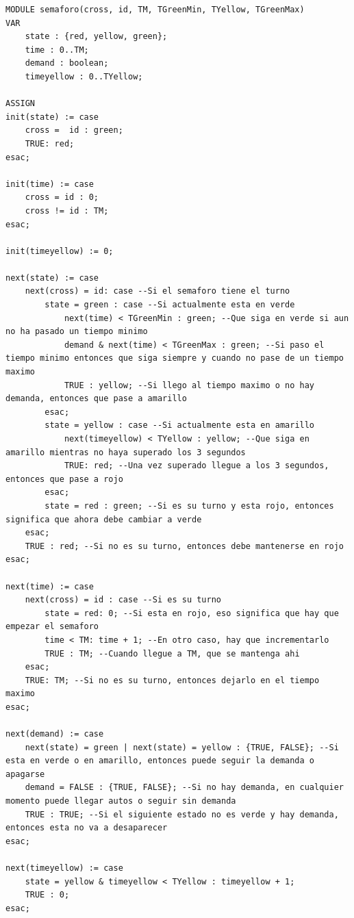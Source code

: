 \begin{lstlisting}[language=NuSMV, caption={Modelo con tiempo de espera}]
MODULE semaforo(cross, id, TM, TGreenMin, TYellow, TGreenMax)
VAR
    state : {red, yellow, green};
    time : 0..TM;
    demand : boolean;
    timeyellow : 0..TYellow;

ASSIGN
init(state) := case
    cross =  id : green;
    TRUE: red;
esac;

init(time) := case
    cross = id : 0;
    cross != id : TM;
esac;

init(timeyellow) := 0;

next(state) := case
    next(cross) = id: case --Si el semaforo tiene el turno
        state = green : case --Si actualmente esta en verde
            next(time) < TGreenMin : green; --Que siga en verde si aun no ha pasado un tiempo minimo
            demand & next(time) < TGreenMax : green; --Si paso el tiempo minimo entonces que siga siempre y cuando no pase de un tiempo maximo 
            TRUE : yellow; --Si llego al tiempo maximo o no hay demanda, entonces que pase a amarillo
        esac;
        state = yellow : case --Si actualmente esta en amarillo
            next(timeyellow) < TYellow : yellow; --Que siga en amarillo mientras no haya superado los 3 segundos
            TRUE: red; --Una vez superado llegue a los 3 segundos, entonces que pase a rojo
        esac;
        state = red : green; --Si es su turno y esta rojo, entonces significa que ahora debe cambiar a verde
    esac;
    TRUE : red; --Si no es su turno, entonces debe mantenerse en rojo
esac;

next(time) := case
    next(cross) = id : case --Si es su turno
        state = red: 0; --Si esta en rojo, eso significa que hay que empezar el semaforo
        time < TM: time + 1; --En otro caso, hay que incrementarlo
        TRUE : TM; --Cuando llegue a TM, que se mantenga ahi
    esac;
    TRUE: TM; --Si no es su turno, entonces dejarlo en el tiempo maximo
esac;

next(demand) := case 
    next(state) = green | next(state) = yellow : {TRUE, FALSE}; --Si esta en verde o en amarillo, entonces puede seguir la demanda o apagarse
    demand = FALSE : {TRUE, FALSE}; --Si no hay demanda, en cualquier momento puede llegar autos o seguir sin demanda
    TRUE : TRUE; --Si el siguiente estado no es verde y hay demanda, entonces esta no va a desaparecer
esac;

next(timeyellow) := case
    state = yellow & timeyellow < TYellow : timeyellow + 1;
    TRUE : 0;
esac;


\end{lstlisting}
